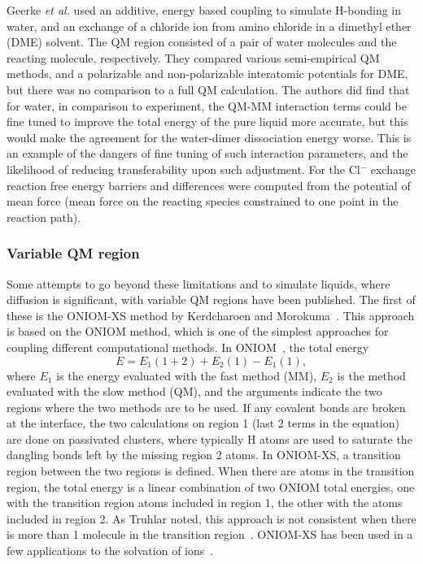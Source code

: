 \documentclass[11pt]{revtex4}
\begin{document}
Geerke {\it et al.} used an additive, energy based coupling to
simulate H-bonding in water, and an exchange of a chloride ion from
amino chloride in a dimethyl ether (DME) solvent.  The QM region
consisted of a pair of water molecules and the reacting molecule,
respectively.  They compared various semi-empirical QM methods, and
a polarizable and non-polarizable interatomic potentials for DME,
but there was no comparison to a full QM calculation.  The authors
did find that for water, in comparison to experiment, the QM-MM
interaction terms could be fine tuned to improve the total energy
of the pure liquid more accurate, but this would make the agreement
for the water-dimer dissociation energy worse.  This is an example
of the dangers of fine tuning of such interaction parameters, and
the likelihood of reducing transferability upon such adjustment.
For the Cl$^-$ exchange reaction free energy barriers and differences
were computed from the potential of mean force (mean force on the
reacting species constrained to one point in the reaction path).

\subsubsection{Variable QM region}

Some attempts to go beyond these limitations and to simulate liquids,
where diffusion is significant, with variable QM regions have been published.  The first of
these is the ONIOM-XS method by Kerdcharoen and
Morokuma~\cite{kerdcharoen_chem_phys_lett_2002a}.  This approach is
based on the ONIOM method, which is one of the simplest approaches
for coupling different computational methods.  In ONIOM~\cite{svensson_j_phys_chem_1996a},
the total energy
$$ E = E_1(1+2) + E_2(1) - E_1(1), $$
where $E_1$ is the energy evaluated with the fast method (MM), $E_2$ is
the method evaluated with the slow method (QM), and the arguments
indicate the two regions where the two methods are to be used.  If
any covalent bonds are broken at the interface, the two calculations
on region 1 (last 2 terms in the equation) are done on passivated
clusters, where typically H atoms are used to saturate the dangling
bonds left by the missing region 2 atoms.  In ONIOM-XS, a transition
region between the two regions is defined.  When there are atoms
in the transition region, the total energy is a linear combination
of two ONIOM total energies, one with the transition region atoms
included in region 1, the other with the atoms included in region
2.  As Truhlar noted, this approach is not consistent when there
is more than 1 molecule in the transition
region~\cite{heyden_j_phys_chem_b_2007a}.  ONIOM-XS has been used
in a few applications to the solvation of
ions~\cite{kerdcharoen_j_chem_phys_2003a,hofer_j_amer_chem_soc_2005a}.
\end{document}
